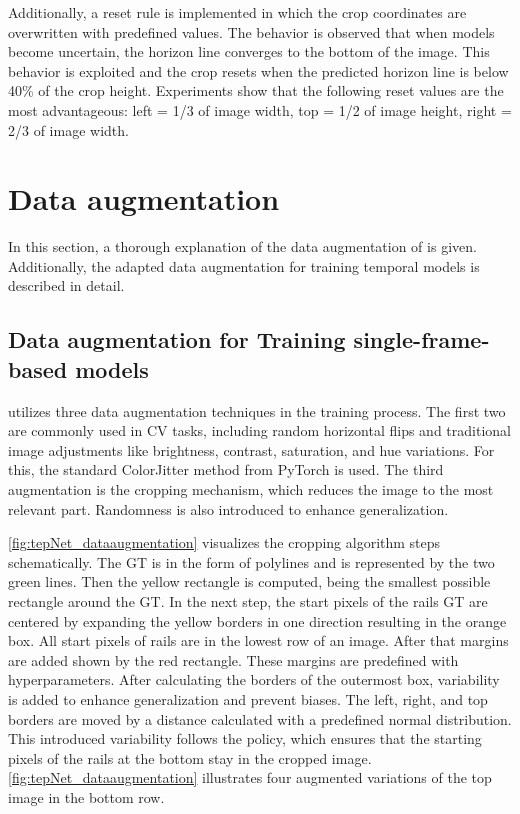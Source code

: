Additionally, a reset rule is implemented in which the crop coordinates are overwritten with predefined values.
The behavior is observed that when models become uncertain, the horizon line converges to the bottom of the image.
This behavior is exploited and the crop resets when the predicted horizon line is below 40\% of the crop height.
Experiments show that the following reset values are the most advantageous: left = 1/3 of image width, top = 1/2 of image height, right = 2/3 of image width.

\clearpage

\section{Data augmentation}
\label{sec:dataaugmentation}

In this section, a thorough explanation of the data augmentation of \cite{tepNet2024} is given.
Additionally, the adapted data augmentation for training temporal models is described in detail.

\subsection{Data augmentation for Training single-frame-based models}

\cite{tepNet2024} utilizes three data augmentation techniques in the training process.
The first two are commonly used in \ac{CV} tasks, including random horizontal flips and traditional image adjustments like brightness, contrast, saturation, and hue variations.
For this, the standard ColorJitter \cite{pytorch_colorJitter_docu} method from PyTorch is used.
The third augmentation is the cropping mechanism, which reduces the image to the most relevant part.
Randomness is also introduced to enhance generalization.

\autoref{fig:tepNet_dataaugmentation} visualizes the cropping algorithm steps schematically.
The \ac{GT} is in the form of polylines and is represented by the two green lines.
Then the yellow rectangle is computed, being the smallest possible rectangle around the \ac{GT}.
In the next step, the start pixels of the rails \ac{GT} are centered by expanding the yellow borders in one direction resulting in the orange box.
All start pixels of rails are in the lowest row of an image.
After that margins are added shown by the red rectangle.
These margins are predefined with hyperparameters.
After calculating the borders of the outermost box, variability is added to enhance generalization and prevent biases.
The left, right, and top borders are moved by a distance calculated with a predefined normal distribution.
This introduced variability follows the policy, which ensures that the starting pixels of the rails at the bottom stay in the cropped image.
\autoref{fig:tepNet_dataaugmentation} illustrates four augmented variations of the top image in the bottom row.

